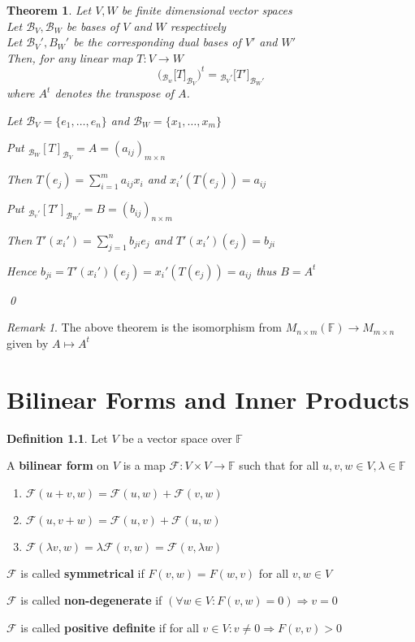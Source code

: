 \documentclass[11pt, a4paper]{report}
\makeatletter
\numberwithin{equation}{section}
\newcommand{\B}{\mathcal{B}}
\newcommand{\F}{\mathbb{F}}
\newcommand{\Fc}{\mathcal{F}}
\numberwithin{equation}{subsection}
\theoremstyle{plain}
\newtheorem{thm}{Theorem}[chapter] %
\theoremstyle{definition}
\newtheorem{defn}{Definition}[chapter]
\theoremstyle{remark}
\newtheorem*{rem}{Remark}
\newtheorem*{prf}{Proof}
\renewenvironment{prf}[1][\proofname]{\par
  \vspace{-\topsep}%
  \normalfont
  \topsep0pt \partopsep0pt %
  \trivlist
  \item[\hskip\labelsep
        \itshape
    #1\@addpunct{.}]\ignorespaces
}{%
  \popQED\endtrivlist\@endpefalse
  \addvspace{6pt plus 6pt} %
}
\newcommand{\pr}[1]{\begin{adjustwidth}{1cm}{} \begin{prf} #1 \end{prf} \end{adjustwidth}}
\makeatother
\begin{document}
\begin{thm}
Let $V, W$ be finite dimensional vector spaces\\
Let $\B_V, \B_W$ be bases of $V$ and $W$ respectively\\
Let $\B_V', B_W'$ be the corresponding dual bases of $V'$ and $W'$\\
Then, for any linear map $T: V \to W$
$$\Big( {_{\B_w}[}T]_{\B_V} \Big)^t = {_{\B_V'}[}T']_{\B_W'}$$
where $A^t$ denotes the transpose of $A$.

\pr{
Let $\B_V = \{ e_1, \ldots, e_n \}$ and $\B_W = \{ x_1, \ldots, x_m \}$

Put $_{\B_W}[T]_{\B_V} = A = (a_{ij})_{m \times n}$

Then $\displaystyle T(e_j) = \sum_{i=1}^m a_{ij} x_i$ and $x_i'(T(e_j)) = a_{ij}$

Put $_{\B_v'}[T']_{\B_W'} = B = (b_{ij})_{n \times m}$

Then $\displaystyle T'(x_i') = \sum_{j=1}^n b_{ji} e_j$ and $T'(x_i')(e_j) = b_{ji}$

Hence $b_{ji} = T'(x_i')(e_j) = x_i'(T(e_j)) = a_{ij}$ thus $B = A^t$
}\qed
\end{thm}

\begin{rem} The above theorem is the isomorphism from $M_{n \times m}(\F) \to M_{m \times n}$ given by $A \mapsto A^t$ \end{rem}

\chapter{Bilinear Forms and Inner Products}

\begin{defn}
Let $V$ be a vector space over $\F$

A \textbf{bilinear form} on $V$ is a map $\mathcal{F} : V \times V \to \F$ such that for all $u, v,w \in V, \lambda \in \F$
\begin{adjustwidth}{1cm}{}
\begin{enumerate}[(1) ]
\item $\Fc(u + v, w) = \Fc(u,w) + \Fc(v,w)$
\item $\Fc(u, v + w) = \Fc(u,v) + \Fc(u,w)$
\item $\Fc(\lambda v, w) = \lambda \Fc(v,w) = \Fc(v, \lambda w)$
\end{enumerate}
\end{adjustwidth}
$\Fc$ is called \textbf{symmetrical} if $F(v,w) = F(w,v)$ for all $v,w \in V$

$\Fc$ is called \textbf{non-degenerate} if $(\forall w \in V : F(v,w) = 0) \Rightarrow v = 0$

$\Fc$ is called \textbf{positive definite} if for all $v \in V: v \neq 0 \Rightarrow F(v,v) > 0$
\end{defn}
\end{document}

